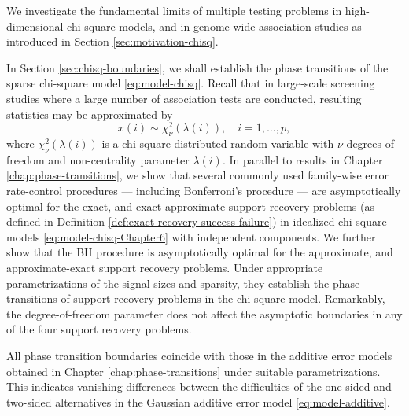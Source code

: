 
We investigate the fundamental limits of multiple testing problems in high-dimensional chi-square models, and in genome-wide association studies as introduced in Section \ref{sec:motivation-chisq}.

In Section \ref{sec:chisq-boundaries}, we shall establish the phase transitions of the sparse chi-square model \eqref{eq:model-chisq}.
Recall that in large-scale screening studies where a large number of association tests are conducted, resulting statistics may be approximated by
\begin{equation} \label{eq:model-chisq-Chapter6}
    x(i) \sim \chi_\nu^2\left(\lambda(i)\right), \quad i=1,\ldots,p,
\end{equation}
where $\chi_\nu^2\left(\lambda(i)\right)$ is a chi-square distributed random variable with $\nu$ degrees of freedom and non-centrality parameter $\lambda(i)$.
In parallel to results in Chapter \ref{chap:phase-transitions}, we show that several commonly used family-wise error rate-control procedures --- including Bonferroni's procedure --- are asymptotically optimal for the {exact}, and {exact-approximate} support recovery problems (as defined in Definition \ref{def:exact-recovery-success-failure}) in idealized chi-square models \eqref{eq:model-chisq-Chapter6} with independent components.
We further show that the \ac{BH} procedure is asymptotically optimal for the {approximate}, and {approximate-exact} support recovery problems.
Under appropriate parametrizations of the signal sizes and sparsity, they establish the phase transitions of support recovery problems in the chi-square model.
Remarkably, the degree-of-freedom parameter does not affect the asymptotic boundaries in any of the four support recovery problems.

All phase transition boundaries coincide with those in the additive error models obtained in Chapter \ref{chap:phase-transitions} under suitable parametrizations.
This indicates vanishing differences between the difficulties of the one-sided and two-sided alternatives in the Gaussian additive error model \eqref{eq:model-additive}.

\medskip

